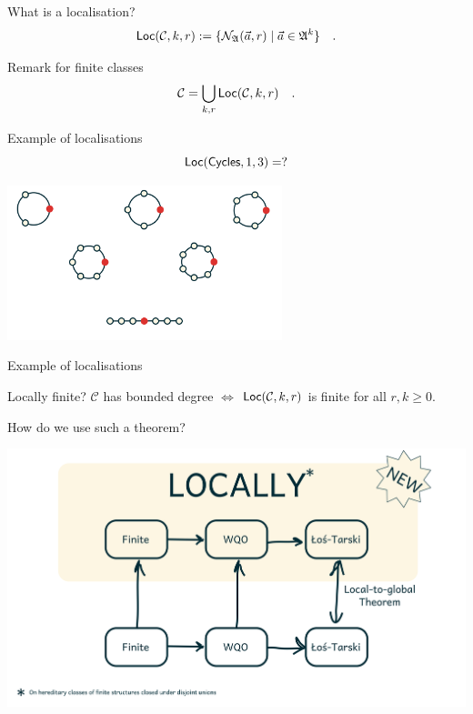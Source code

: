 \documentclass{beamer}
\begin{document}
\begin{frame}{What is a localisation?}
    \begin{equation*}
        \mathsf{Loc}(\mathcal{C},k, r) :=
        \{ 
            \mathcal{N}_{\mathfrak{A}}(\vec{a}, r)
         \mid 
            \vec{a} \in \mathfrak{A}^k
         \}
        \quad .
    \end{equation*}
    \pause
    \begin{alertblock}{Remark for finite classes}
        \begin{equation*}
            \mathcal{C} = \bigcup_{k,r} \mathsf{Loc}(\mathcal{C},k, r) \quad .
        \end{equation*}
    \end{alertblock}
\end{frame}

\begin{frame}{Example of localisations}
    \begin{equation*}
        \mathsf{Loc}(\mathsf{Cycles},1, 3) = ? 
    \end{equation*}
    \pause
    \begin{center}
        \includegraphics[width=8cm]{figures/quizz_Page 16.png}
    \end{center}
\end{frame}

\begin{frame}{Example of localisations}
    \begin{alertblock}{Locally finite?}
        \centering
        $\mathcal{C}$ has bounded degree
        $\iff$
        $\mathsf{Loc}(\mathcal{C},k, r)$ is finite for all $r,k \geq 0$.
    \end{alertblock}
\end{frame}

\begin{frame}{How do we use such a theorem?}
    \begin{center}
        \includegraphics[width=15cm]{figures/quizz_Page 17.png}
    \end{center}
\end{frame}
\end{document}

